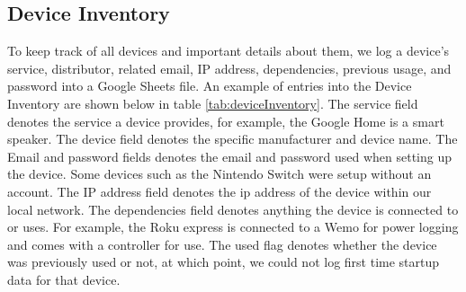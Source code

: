 \subsection{Device Inventory}
\label{Device Inventory}
To keep track of all devices and important details about them, we log a device's service, distributor, related email, IP address, dependencies, previous usage, and password into a Google Sheets file. An example of entries into the Device Inventory are shown below in table \ref{tab:deviceInventory}. The service field denotes the service a device provides, for example, the Google Home is a smart speaker. The device field denotes the specific manufacturer and device name. The Email and password fields denotes the email and password used when setting up the device. Some devices such as the Nintendo Switch were setup without an account. The IP address field denotes the ip address of the device within our local network. The dependencies field denotes anything the device is connected to or uses. For example, the Roku express is connected to a Wemo for power logging and comes with a controller for use. The used flag denotes whether the device was previously used or not, at which point, we could not log first time startup data for that device.

\begin{table}[H]
    \centering
    \caption{Device inventory excerpt. Password column not shown.}
    \label{tab:deviceInventory}
\end{table}


